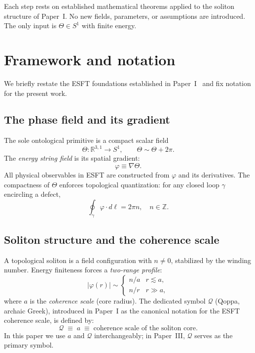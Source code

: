 \documentclass[a4paper,12pt]{article}
\newcommand{\Qoppa}{\mathcal{Q}} %
\newcommand{\qoppa}{\Qoppa} %
\begin{document}
Each step rests on established mathematical theorems applied to the
soliton structure of Paper~I\@. No new fields, parameters, or
assumptions are introduced. The only input is $\Theta \in S^1$
with finite energy.


\section{Framework and notation}
\label{sec:framework}

We briefly restate the ESFT foundations established in
Paper~I~\cite{PaperI} and fix notation for the present work.

\subsection{The phase field and its gradient}

The sole ontological primitive is a compact scalar field
\begin{equation}
\label{eq:theta}
 \Theta: \mathbb{R}^{3,1} \to S^1, \qquad \Theta \sim \Theta + 2\pi.
\end{equation}
The \emph{energy string field} is its spatial gradient:
\begin{equation}
\label{eq:phi}
 \boxed{\varphi \equiv \nabla\Theta.}
\end{equation}
All physical observables in ESFT are constructed from $\varphi$ and
its derivatives. The compactness of $\Theta$ enforces topological
quantization: for any closed loop $\gamma$ encircling a defect,
\begin{equation}
\label{eq:winding}
 \oint_\gamma \varphi \cdot d\boldsymbol{\ell} = 2\pi n,
 \quad n \in \mathbb{Z}.
\end{equation}

\subsection{Soliton structure and the coherence scale}

A topological soliton is a field configuration with $n \neq 0$,
stabilized by the winding number. Energy finiteness forces a
\emph{two-range profile}:
\begin{equation}
\label{eq:tworange}
 |\varphi(r)| \sim
 \begin{cases}
 n/a & r \lesssim a, \\
 n/r & r \gg a,
 \end{cases}
\end{equation}
where $a$ is the \emph{coherence scale} (core radius).
The dedicated symbol $\qoppa$ (Qoppa, archaic Greek), introduced in
Paper~I as the canonical notation for the ESFT coherence scale, is
defined by:
\begin{equation}
\label{eq:qoppa}
 \qoppa \;\equiv\; a \;\equiv\; \text{coherence scale of the soliton core}.
\end{equation}
In this paper we use $a$ and $\qoppa$ interchangeably; in Paper~III,
$\qoppa$ serves as the primary symbol.
\end{document}
